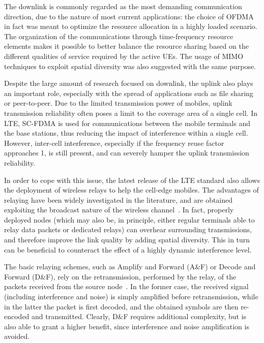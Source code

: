 \documentclass[12pt, letterpaper, onecolumn, draftcls]{IEEEtran}
\begin{document}
The downlink is commonly regarded as the most demanding communication direction, due to the nature of most current applications: the choice of OFDMA in fact was meant to optimize the resource allocation in a highly loaded scenario. The organization of the communications through time-frequency resource elements makes it possible to better balance the resource sharing based on the different qualities of service required by the active UEs. The usage of MIMO techniques to exploit spatial diversity was also suggested with the same purpose.

Despite the large amount of research focused on downlink, the uplink also plays an important role, especially with the spread of applications such as file sharing or peer-to-peer. Due to the limited transmission power of mobiles, uplink transmission reliability often poses a limit to the coverage area of a single cell. In LTE, SC-FDMA is used for communications between the mobile terminals and the base stations, thus reducing the impact of interference within a single cell. However, inter-cell interference, especially if the frequency reuse factor approaches 1, is still present, and can severely hamper the uplink transmission reliability.

In order to cope with this issue, the latest release of the LTE standard also allows the deployment of wireless relays to help the cell-edge mobiles. The advantages of relaying have been widely investigated in the literature, and are obtained exploiting the broadcast nature of the wireless channel~\cite{mio22,mio7}. In fact, properly deployed nodes (which may also be, in principle, either regular terminals able to relay data packets or dedicated relays) can overhear surrounding transmissions, and therefore improve the link quality by adding spatial diversity. This in turn can be beneficial to counteract the effect of a highly dynamic interference level.

The basic relaying schemes, such as Amplify and Forward (A\&F) or Decode and Forward (D\&F), rely on the retransmission, performed by the relay, of the packets received from the source node~\cite{mio7,altroKramer,mio33,altroHost}. In the former case, the received signal (including interference and noise) is simply amplified before retransmission, while in the latter the packet is first decoded, and the obtained symbols are then re-encoded and transmitted. Clearly, D\&F requires additional complexity, but is also able to grant a higher benefit, since interference and noise amplification is avoided.
\end{document}
